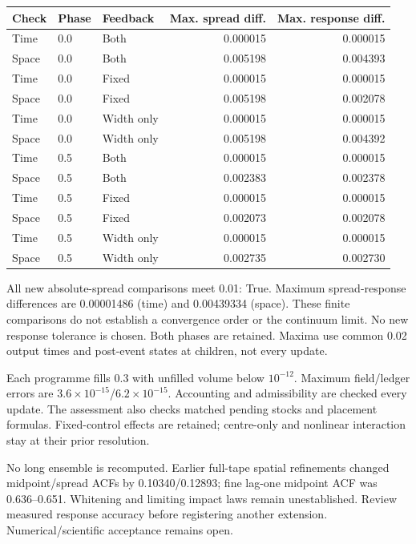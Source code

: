 \documentclass[11pt,a4paper]{article}
\begin{document}
\begin{center}\small\begin{tabular}{lllrr}
\toprule
Check & Phase & Feedback & Max. spread diff. & Max. response diff.\\
\midrule
Time & 0.0 & Both & 0.000015 & 0.000015 \\
Space & 0.0 & Both & 0.005198 & 0.004393 \\
Time & 0.0 & Fixed & 0.000015 & 0.000015 \\
Space & 0.0 & Fixed & 0.005198 & 0.002078 \\
Time & 0.0 & Width only & 0.000015 & 0.000015 \\
Space & 0.0 & Width only & 0.005198 & 0.004392 \\
Time & 0.5 & Both & 0.000015 & 0.000015 \\
Space & 0.5 & Both & 0.002383 & 0.002378 \\
Time & 0.5 & Fixed & 0.000015 & 0.000015 \\
Space & 0.5 & Fixed & 0.002073 & 0.002078 \\
Time & 0.5 & Width only & 0.000015 & 0.000015 \\
Space & 0.5 & Width only & 0.002735 & 0.002730 \\
\bottomrule
\end{tabular}\end{center}
All new absolute-spread comparisons meet 0.01: True.
Maximum spread-response differences are 0.00001486 (time) and
0.00439334 (space).
These finite comparisons do not establish a convergence order or the continuum
limit. No new response tolerance is chosen. Both phases are retained. Maxima
use common 0.02 output times and post-event states at children, not every update.

Each programme fills 0.3 with unfilled volume below $10^{-12}$. Maximum
field/ledger errors are $3.6\times10^{-15}$/$6.2\times10^{-15}$.
Accounting and admissibility are checked every update. The assessment also
checks matched pending stocks and placement formulas. Fixed-control effects
are retained; centre-only and nonlinear interaction stay at their prior resolution.

No long ensemble is recomputed. Earlier full-tape spatial refinements changed
midpoint/spread ACFs by 0.10340/0.12893; fine lag-one midpoint ACF was
0.636--0.651. Whitening and limiting impact laws remain unestablished.
Review measured response accuracy before registering another extension.
Numerical/scientific acceptance remains open.
\end{document}
